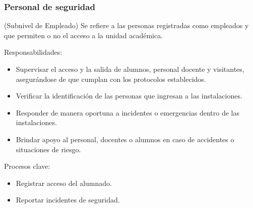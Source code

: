 \begin{Usuario}{\hypertarget{tPersonalSeguridad}{\subsubsection{Personal de seguridad}}}{(Subnivel de Empleado)}{
        Se refiere a las personas registradas como empleados y que permiten o no el acceso a la unidad académica.
    }
    \item[Responsabilidades:] \cdtEmpty
    \begin{itemize}
        \item Supervisar el acceso y la salida de alumnos, personal docente y visitantes, asegurándose de que cumplan con los protocolos establecidos.
        \item Verificar la identificación de las personas que ingresan a las instalaciones.
        \item Responder de manera oportuna a incidentes o emergencias dentro de las instalaciones.
        \item Brindar apoyo al personal, docentes o alumnos en caso de accidentes o situaciones de riesgo.
    \end{itemize}
    \item[Procesos clave:] \cdtEmpty
    \begin{itemize}
         \item Registrar acceso del alumnado.
         \item Reportar incidentes de seguridad.
    \end{itemize}
\end{Usuario}

